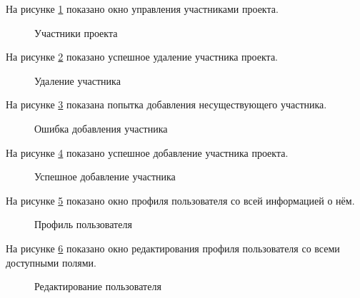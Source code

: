 На рисунке \ref{управление_окно:image} показано окно управления участниками проекта.

\newpage

\begin{figure}[ht]
	\caption{Участники проекта}
	\label{управление_окно:image}
\end{figure}

На рисунке \ref{управление_удаление:image} показано успешное удаление участника проекта.
\begin{figure}[ht]
	\caption{Удаление участника}
	\label{управление_удаление:image}
\end{figure}

На рисунке \ref{управление_некорректно:image} показана попытка добавления несуществующего участника.

\newpage

\begin{figure}[ht]
	\caption{Ошибка добавления участника}
	\label{управление_некорректно:image}
\end{figure}

На рисунке \ref{управление_успешно:image} показано успешное добавление участника проекта.
\begin{figure}[ht]
	\caption{Успешное добавление участника}
	\label{управление_успешно:image}
\end{figure}

На рисунке \ref{профиль_окно:image} показано окно профиля пользователя со всей информацией о нём.
\begin{figure}[ht]
	\caption{Профиль пользователя}
	\label{профиль_окно:image}
\end{figure}

На рисунке \ref{профиль_редактирование:image} показано окно редактирования профиля пользователя со всеми доступными полями.

\newpage

\begin{figure}[ht]
	\caption{Редактирование пользователя}
	\label{профиль_редактирование:image}
\end{figure}

